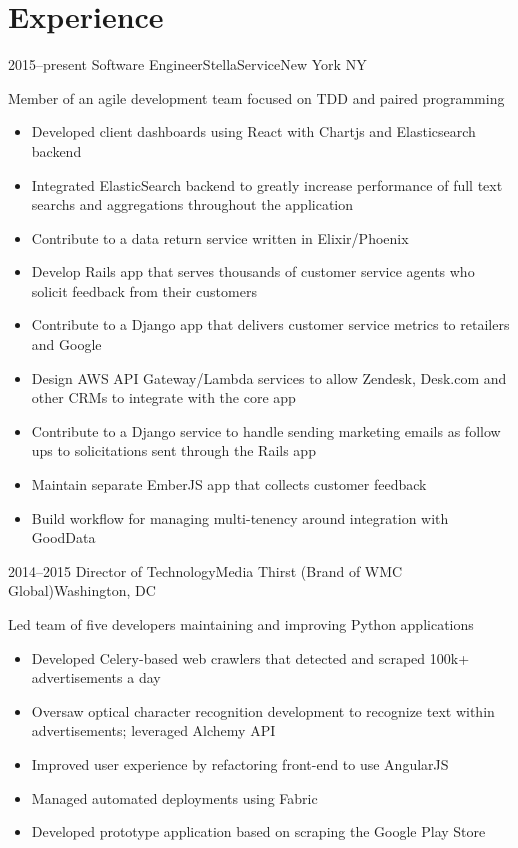 \documentclass[10pt,a4paper,merriweather]{moderncv}        %
\begin{document}
\makecvtitle
\vspace{-1.25cm}

\section{Experience}

\cventry
{2015--present}
{Software Engineer}{StellaService}{New York NY}{}
{Member of an agile development team focused on TDD and paired programming
\begin{itemize}
\item Developed client dashboards using React with Chartjs and Elasticsearch backend
\item Integrated ElasticSearch backend to greatly increase performance of full text searchs and aggregations throughout the application
\item Contribute to a data return service written in Elixir/Phoenix
\item Develop Rails app that serves thousands of customer service agents who solicit feedback from their customers
\item Contribute to a Django app that delivers customer service metrics to retailers and Google
\item Design AWS API Gateway/Lambda services to allow Zendesk, Desk.com and other CRMs to integrate with the core app
\item Contribute to a Django service to handle sending marketing emails as follow ups to solicitations sent through the Rails app
\item Maintain separate EmberJS app that collects customer feedback
\item Build workflow for managing multi-tenency around integration with GoodData
\end{itemize}}

\cventry
{2014--2015}
{Director of Technology}{Media Thirst (Brand of WMC Global)}{Washington, DC}{}
{Led team of five developers maintaining and improving Python applications
\begin{itemize}
\item Developed Celery-based web crawlers that detected and scraped 100k+ advertisements a day
\item Oversaw optical character recognition development to recognize text within advertisements; leveraged Alchemy API
\item Improved user experience by refactoring front-end to use AngularJS
\item Managed automated deployments using Fabric
\item Developed prototype application based on scraping the Google Play Store
\end{itemize}}
\vspace{.15cm}
\end{document}

